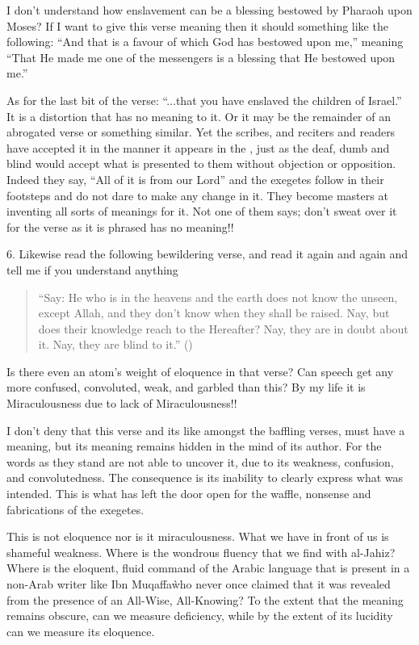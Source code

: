 \documentclass[12pt]{memoir}
\begin{document}
I don’t understand how enslavement can be a blessing
bestowed by Pharaoh upon Moses?
If I want to give this verse meaning
then it should  something like the following:
“And that is a favour of which God has bestowed upon me,” meaning
“That He made me one of the messengers is a blessing that He bestowed upon me.”

As for the last bit of the verse:
“...that you have enslaved the children of Israel.”
It is a distortion that has no meaning to it.
Or it may be the remainder of an abrogated verse or something similar.
Yet the scribes, and reciters and readers have accepted it
in the manner it appears in the \Quran, just as the deaf,
dumb and blind would accept what is presented to them
without objection or opposition.
Indeed they say, “All of it is from our Lord” and the exegetes follow
in their footsteps and do not dare to make any change in it.
They become masters at inventing all sorts of meanings for it.
Not one of them says;
don’t sweat over it for the verse as it is phrased has no meaning!!

6. Likewise read the following bewildering verse,
and read it again and again and tell me if you understand anything

\begin{quote}
“Say: He who is in the heavens and the earth does not know the unseen,
except Allah, and they don’t know when they shall be raised.
Nay, but does their knowledge reach to the Hereafter?
Nay, they are in doubt about it. Nay, they are blind to it.”
()
\end{quote}

Is there even an atom’s weight of eloquence in that verse?
Can speech get any more confused, convoluted, weak, and garbled than this?
By my life it is Miraculousness due to lack of Miraculousness!!

I don’t deny that this verse and its like amongst the baffling verses,
must have a meaning, but its meaning remains hidden in the mind of its author.
For the words as they stand are not able to uncover it,
due to its weakness, confusion, and convolutedness.
The consequence is its inability to clearly express what was intended.
This is what has left the door open for the waffle,
nonsense and fabrications of the exegetes.

This is not eloquence nor is it miraculousness.
What we have in front of us is shameful weakness.
Where is the wondrous fluency that we find with al-Jahiz?
Where is the eloquent, fluid command of the Arabic language
that is present in a non-Arab writer like Ibn Muqaffa\`
who never once claimed that it was revealed
from the presence of an All-Wise, All-Knowing?
To the extent that the meaning remains obscure, can we measure deficiency,
while by the extent of its lucidity can we measure its eloquence.
\end{document}
